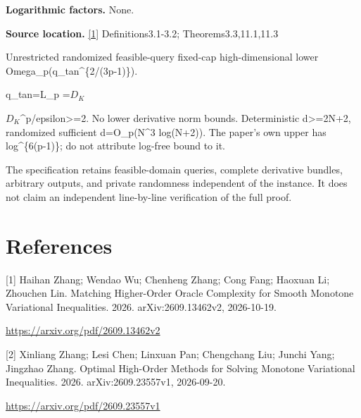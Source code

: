 \documentclass[10pt,a4paper]{article}
\newcommand{\AtlasMath}[1]{\par\begingroup\centering\setbox0=\hbox{$\displaystyle #1$}\ifdim\wd0>1.4\linewidth\typeout{ATLAS WIDE FORMULA: \the\wd0}\fi\ifdim\wd0>\linewidth\resizebox{\linewidth}{!}{\box0}\else\box0\fi\par\endgroup}
\newcommand{\AtlasInlineMath}[1]{\begingroup\setbox0=\hbox{$#1$}\ifdim\wd0>.4\linewidth\endgroup\AtlasMath{#1}\else\endgroup$#1$\fi}
\begin{document}
\textbf{Logarithmic factors.} None.

\textbf{Source location.} \href{https://arxiv.org/pdf/2609.13462v2}{[1]} Definitions3.1-3.2; Theorems3.3,11.1,11.3

Unrestricted randomized feasible-query fixed-cap high-dimensional lower Omega\_p(q\_tan\textasciicircum{}\{2/(3p-1)\}).

q\_tan=L\_p \AtlasInlineMath{D_K}\textasciicircum{}p/epsilon>=2. No lower derivative norm bounds. Deterministic d>=2N+2, randomized sufficient d=O\_p(N\textasciicircum{}3 log(N+2)). The paper's own upper has log\textasciicircum{}\{6(p-1)\}; do not attribute log-free bound to it.

The specification retains feasible-domain queries, complete derivative bundles, arbitrary outputs, and private randomness independent of the instance. It does not claim an independent line-by-line verification of the full proof.

\section{References}
[1] Haihan Zhang; Wendao Wu; Chenheng Zhang; Cong Fang; Haoxuan Li; Zhouchen Lin. Matching Higher-Order Oracle Complexity for Smooth Monotone Variational Inequalities. 2026. arXiv:2609.13462v2, 2026-10-19.

\url{https://arxiv.org/pdf/2609.13462v2}

[2] Xinliang Zhang; Lesi Chen; Linxuan Pan; Chengchang Liu; Junchi Yang; Jingzhao Zhang. Optimal High-Order Methods for Solving Monotone Variational Inequalities. 2026. arXiv:2609.23557v1, 2026-09-20.

\url{https://arxiv.org/pdf/2609.23557v1}
\end{document}

